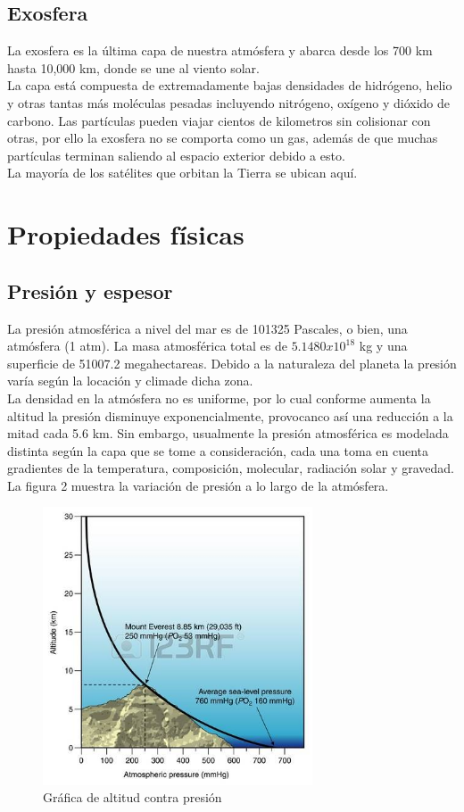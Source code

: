 \subsection{Exosfera}
La exosfera es la última capa de nuestra atmósfera y abarca desde los
700 km hasta 10,000 km, donde se une al viento solar.
\\[3mm] La capa está compuesta de extremadamente bajas densidades de hidrógeno, helio y otras tantas más moléculas pesadas incluyendo
nitrógeno, oxígeno y dióxido de carbono. Las partículas pueden viajar cientos de kilometros sin colisionar con otras, por ello la exosfera
no se comporta como un gas, además de que muchas partículas terminan saliendo al espacio exterior debido a esto.
\\[3mm] La mayoría de los satélites que orbitan la Tierra se ubican
aquí.

\section{Propiedades físicas}
\subsection{Presión y espesor}
La presión atmosférica a nivel del mar es de 101325 Pascales, o bien,
una atmósfera (1 atm). La masa atmosférica total es de $5.1480x10^{18}$
kg y una superficie de 51007.2 megahectareas. Debido a la naturaleza
del planeta la presión  varía según la locación y climade dicha zona.
\\[3mm] La densidad en la atmósfera no es uniforme, por lo cual conforme
aumenta la altitud la presión disminuye exponencialmente, provocanco así
una reducción a la mitad cada 5.6 km. Sin embargo, usualmente la presión
atmosférica es modelada distinta según la capa que se tome a consideración,
cada una toma en cuenta gradientes de la temperatura, composición, molecular, radiación solar y gravedad.
\\[3mm] La figura 2 muestra la variación de presión a lo largo de la
atmósfera.

\begin{figure}
\centering
\includegraphics[width=8cm]{presion}
\caption{\label{presion} Gráfica de altitud contra presión}
\end{figure}

